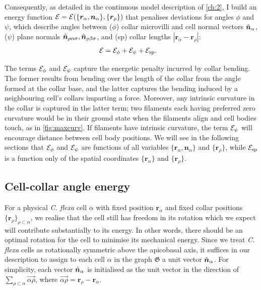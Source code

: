 Consequently, as detailed in the continuous model description of \cref{ch:2}, I build an energy function $\mathcal{E} = \mathcal{E}(\{\bm{r}_\alpha, \bm{n}_\alpha\}, \{\bm{r}_\rho\})$ that penalises deviations for angles $\phi$ and $\psi$, which describe angles between ($\phi$) collar microvilli and cell normal vectors $\hat{\bm{n}}_\alpha$, ($\psi$) plane normals $\hat{\bm{n}}_{\rho\alpha\sigma}, \hat{\bm{n}}_{\rho\beta\sigma}$, and (sp) collar lengths $|\bm{r}_\alpha - \bm{r}_\rho|$:
\begin{align}
	\mathcal{E} &= \mathcal{E}_\phi + \mathcal{E}_\psi + \mathcal{E}_{\text{sp}}. \label{eq:e}
\end{align}

The terms $\mathcal{E}_\phi$ and $\mathcal{E}_\psi$ capture the energetic penalty incurred by collar bending.
The former results from bending over the length of the collar from the angle formed at the collar base, and the latter captures the bending induced by a neighbouring cell's collars imparting a force.
Moreover, any intrinsic curvature in the collar is captured in the latter term; two filaments each having preferred zero curvature would be in their ground state when the filaments align and cell bodies touch, as in \cref{fig:maxcurv}.
If filaments have intrinsic curvature, the term $\mathcal{E}_\psi$ will encourage distance between cell body positions.
We will see in the following sections that $\mathcal{E}_\phi$ and $\mathcal{E}_\psi$ are functions of all variables $\{\bm{r}_\alpha, \bm{n}_\alpha\}$ and $\{\bm{r}_\rho\}$, while $\mathcal{E}_{\text{sp}}$ is a function only of the spatial coordinates $\{\bm{r}_\alpha\}$ and $\{\bm{r}_\rho\}$.

\subsection{Cell-collar angle energy}
For a physical \textit{C. flexa} cell $\alpha$ with fixed position $\bm{r}_\alpha$ and fixed collar positions $\{\bm{r}_\rho\}_{\rho\subset\alpha}$, we realise that the cell still has freedom in its rotation which we expect will contribute substantially to its energy. 
In other words, there should be an optimal rotation for the cell to minimise its mechanical energy. 
Since we treat \textit{C. flexa} cells as rotationally symmetric above the apicobasal axis, it suffices in our description to assign to each cell $\alpha$ in the graph $\mathfrak{G}$ a unit vector $\hat{\bm{n}}_\alpha$.
For simplicity, each vector $\hat{\bm{n}}_\alpha$ is initialised as the unit vector in the direction of $\sum_{\rho\subset\alpha} \vec{\alpha\rho}$, where $\vec{\alpha\rho} = \bm{r}_\rho - \bm{r}_\alpha$.

